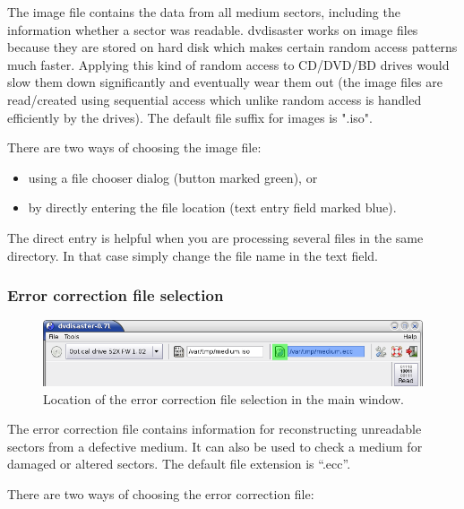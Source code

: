 The image file contains the data from all medium sectors,
including the information whether a sector was readable.
dvdisaster works on image files because they are stored on
hard disk which makes certain random access patterns much faster.
Applying this kind of random access to CD/DVD/BD drives would slow
them down significantly and eventually wear them out (the image
files are read/created using sequential access which unlike random
access is handled efficiently by the drives). The default file
suffix for images is ".iso".

\bigskip

There are two ways of choosing the image file:

\begin{itemize}
\item using a file chooser dialog (button marked green), or
\item by directly entering the file location (text entry field marked blue).
\end{itemize}

The direct entry is helpful when you are processing
several files in the same directory. In that case simply
change the file name in the text field. 

\newpage

\subsubsection{Error correction file selection}
\label{howto-dialogs-eccfile}

\begin{figure}[h]
\centerline{\includegraphics[width=\textwidth]{screenshots/dialog-eccfile-full.png}}
\caption{Location of the error correction file selection in the main window.}
\label{howto-dialog-eccfile-full}
\end{figure}


The error correction file contains information for reconstructing unreadable 
sectors from a defective medium. It can also be used to check a medium for 
damaged or altered sectors. The default file extension is ``.ecc''.

\bigskip

There are two ways of choosing the error correction file:

